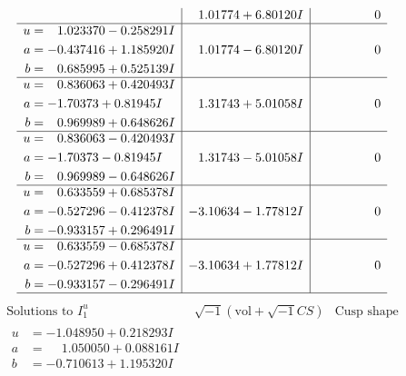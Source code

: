 \documentclass[1p]{elsarticle_modified}
\theoremstyle{definition}
\newcommand{\I}{\sqrt{-1}}
\begin{document}
$$\begin{array}{c|c|c}
 & \phantom{-}1.01774 + 6.80120 I & \phantom{-0.000000 } 0 \\ \hline\begin{aligned}
u &= \phantom{-}1.023370 - 0.258291 I \\
a &= -0.437416 + 1.185920 I \\
b &= \phantom{-}0.685995 + 0.525139 I\end{aligned}
 & \phantom{-}1.01774 - 6.80120 I & \phantom{-0.000000 } 0 \\ \hline\begin{aligned}
u &= \phantom{-}0.836063 + 0.420493 I \\
a &= -1.70373 + 0.81945 I \\
b &= \phantom{-}0.969989 + 0.648626 I\end{aligned}
 & \phantom{-}1.31743 + 5.01058 I & \phantom{-0.000000 } 0 \\ \hline\begin{aligned}
u &= \phantom{-}0.836063 - 0.420493 I \\
a &= -1.70373 - 0.81945 I \\
b &= \phantom{-}0.969989 - 0.648626 I\end{aligned}
 & \phantom{-}1.31743 - 5.01058 I & \phantom{-0.000000 } 0 \\ \hline\begin{aligned}
u &= \phantom{-}0.633559 + 0.685378 I \\
a &= -0.527296 - 0.412378 I \\
b &= -0.933157 + 0.296491 I\end{aligned}
 & -3.10634 - 1.77812 I & \phantom{-0.000000 } 0 \\ \hline\begin{aligned}
u &= \phantom{-}0.633559 - 0.685378 I \\
a &= -0.527296 + 0.412378 I \\
b &= -0.933157 - 0.296491 I\end{aligned}
 & -3.10634 + 1.77812 I & \phantom{-0.000000 } 0\\
 \hline 
 \end{array}$$\newpage$$\begin{array}{c|c|c}  
\text{Solutions to }I^u_{1}& \I (\text{vol} + \sqrt{-1}CS) & \text{Cusp shape}\\
 \hline 
\begin{aligned}
u &= -1.048950 + 0.218293 I \\
a &= \phantom{-}1.050050 + 0.088161 I \\
b &= -0.710613 + 1.195320 I\end{aligned}

\end{array}$$
\end{document}
